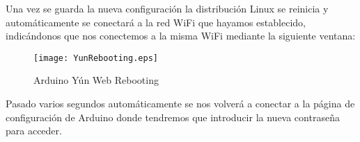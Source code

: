Una vez se guarda la nueva configuración la distribución Linux se reinicia y automáticamente se conectará a la red WiFi que hayamos establecido, indicándonos que nos conectemos a la misma WiFi mediante la siguiente ventana:

\begin{figure}[H]
    \centering
    \texttt{[image: YunRebooting.eps]}
    \caption{Arduino Yún Web Rebooting}\label{fig:yun-web-rebooting}
\end{figure}

Pasado varios segundos automáticamente se nos volverá a conectar a la página de configuración de Arduino donde tendremos que introducir la nueva contraseña para acceder.

